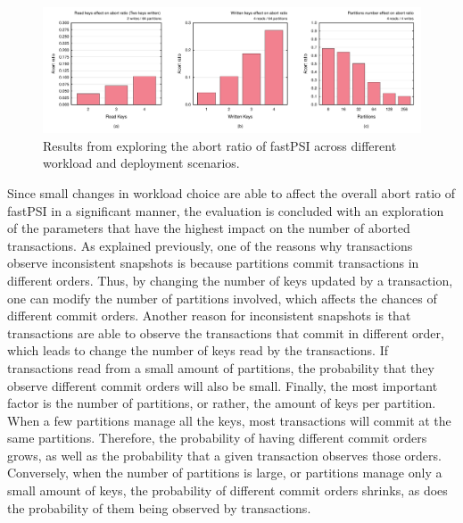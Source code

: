 \begin{figure}[t]
\begin{center}
\includegraphics[width=\textwidth]{figures/psi_read_abort_bench.pdf}
\vspace{-1cm}
\end{center}
\caption{Results from exploring the abort ratio of fastPSI across different workload and deployment scenarios.}
\label{fig:fastpsi_abort_rate}
\end{figure}

Since small changes in workload choice are able to affect the overall abort ratio of fastPSI in a significant manner, the evaluation is concluded with an exploration of the parameters that have the highest impact on the number of aborted transactions. As explained previously, one of the reasons why transactions observe inconsistent snapshots is because partitions commit transactions in different orders. Thus, by changing the number of keys updated by a transaction, one can modify the number of partitions involved, which affects the chances of different commit orders. Another reason for inconsistent snapshots is that transactions are able to observe the transactions that commit in different order, which leads to change the number of keys read by the transactions. If transactions read from a small amount of partitions, the probability that they observe different commit orders will also be small. Finally, the most important factor is the number of partitions, or rather, the amount of keys per partition. When a few partitions manage all the keys, most transactions will commit at the same partitions. Therefore, the probability of having different commit orders grows, as well as the probability that a given transaction observes those orders. Conversely, when the number of partitions is large, or partitions manage only a small amount of keys, the probability of different commit orders shrinks, as does the probability of them being observed by transactions.

